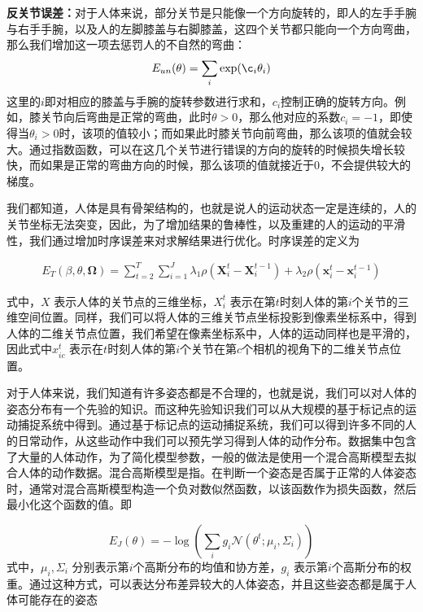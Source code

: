 \textbf{反关节误差：}对于人体来说，部分关节是只能像一个方向旋转的，即人的左手手腕与右手手腕，以及人的左脚膝盖与右脚膝盖，这四个关节都只能向一个方向弯曲，那么我们增加这一项去惩罚人的不自然的弯曲：
\begin{equation}
    E_{un}(\theta) = \sum_i \exp(\c_i\theta_i)
\end{equation}
这里的\(i\)即对相应的膝盖与手腕的旋转参数进行求和，\(c_i\)控制正确的旋转方向。例如，膝关节向后弯曲是正常的弯曲，此时\(\theta>0\)，那么他对应的系数\(c_i = -1\)，即使得当\(\theta_i>0\)时，该项的值较小；而如果此时膝关节向前弯曲，那么该项的值就会较大。通过指数函数，可以在这几个关节进行错误的方向的旋转的时候损失增长较快，而如果是正常的弯曲方向的时候，那么该项的值就接近于0，不会提供较大的梯度。



我们都知道，人体是具有骨架结构的，也就是说人的运动状态一定是连续的，人的关节坐标无法突变，因此，为了增加结果的鲁棒性，以及重建的人的运动的平滑性，我们通过增加时序误差来对求解结果进行优化。时序误差的定义为

\begin{align} 
    E _ { T } ( \beta , \theta , \mathbf { \Omega } ) = \sum _ { t = 2 } ^ { T } \sum _ { i = 1 } ^ { J } \lambda _ { 1 } \rho \left( \mathbf { X } _ { i } ^ { t } - \mathbf { X } _ { i } ^ { t - 1 } \right) + \lambda _ { 2 } \rho \left( \mathbf { x } _ { i } ^ { t } - \mathbf { x } _ { i } ^ { t - 1 } \right)
\end{align}

式中，$X$ 表示人体的关节点的三维坐标，$X_i^t$ 表示在第$t$时刻人体的第$i$个关节的三维空间位置。同样，我们可以将人体的三维关节点坐标投影到像素坐标系中，得到人体的二维关节点位置，我们希望在像素坐标系中，人体的运动同样也是平滑的，因此式中$x_{ic}^t$ 表示在$t$时刻人体的第$i$个关节在第$c$个相机的视角下的二维关节点位置。
 
对于人体来说，我们知道有许多姿态都是不合理的，也就是说，我们可以对人体的姿态分布有一个先验的知识。而这种先验知识我们可以从大规模的基于标记点的运动捕捉系统中得到。通过基于标记点的运动捕捉系统，我们可以得到许多不同的人的日常动作，从这些动作中我们可以预先学习得到人体的动作分布。\cite{mocap}数据集中包含了大量的人体动作，为了简化模型参数，一般的做法是使用一个混合高斯模型去\cite{我也不知道哪篇}拟合人体的动作数据。混合高斯模型是指。在判断一个姿态是否属于正常的人体姿态时，通常对混合高斯模型构造一个负对数似然函数，以该函数作为损失函数，然后最小化这个函数的值。即

$$
    E _ { J } ( \theta ) = - \log \left( \sum _ { i } g _ { i } \mathcal { N } \left( \theta ^ { t } ; \mu _ { i } , \Sigma _ { i } \right) \right)
$$
式中，$\mu_i, \Sigma_i$ 分别表示第$i$个高斯分布的均值和协方差，$g_i$ 表示第$i$个高斯分布的权重。通过这种方式，可以表达分布差异较大的人体姿态，并且这些姿态都是属于人体可能存在的姿态

